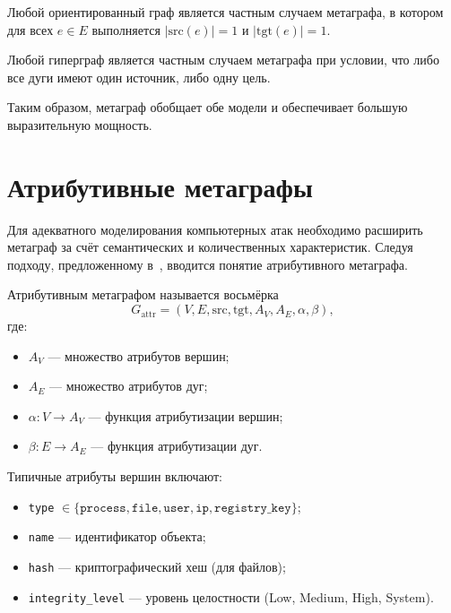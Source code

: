 \begin{lemma}
    Любой ориентированный граф является частным случаем метаграфа, в котором для всех $e \in E$ выполняется $|\mathrm{src}(e)| = 1$ и $|\mathrm{tgt}(e)| = 1$.
\end{lemma}

\begin{lemma}
    Любой гиперграф является частным случаем метаграфа при условии, что либо все дуги имеют один источник, либо одну цель.
\end{lemma}

Таким образом, метаграф обобщает обе модели и обеспечивает большую выразительную мощность.

\section{Атрибутивные метаграфы}\label{sec:ch2/sec2}

Для адекватного моделирования компьютерных атак необходимо расширить метаграф за счёт семантических и количественных характеристик. Следуя подходу, предложенному в~\cite{Latypov2020}, вводится понятие атрибутивного метаграфа.

\begin{definition}
    Атрибутивным метаграфом называется восьмёрка
    \[
        G_{\mathrm{attr}} = (V, E, \mathrm{src}, \mathrm{tgt}, A_V, A_E, \alpha, \beta),
    \]
    где:
    \begin{itemize}
        \item $A_V$ — множество атрибутов вершин;
        \item $A_E$ — множество атрибутов дуг;
        \item $\alpha: V \rightarrow A_V$ — функция атрибутизации вершин;
        \item $\beta: E \rightarrow A_E$ — функция атрибутизации дуг.
    \end{itemize}
\end{definition}

Типичные атрибуты вершин включают:
\begin{itemize}
    \item \texttt{type} $\in \{\texttt{process}, \texttt{file}, \texttt{user}, \texttt{ip}, \texttt{registry\_key}\}$;
    \item \texttt{name} — идентификатор объекта;
    \item \texttt{hash} — криптографический хеш (для файлов);
    \item \texttt{integrity\_level} — уровень целостности (Low, Medium, High, System).
\end{itemize}

